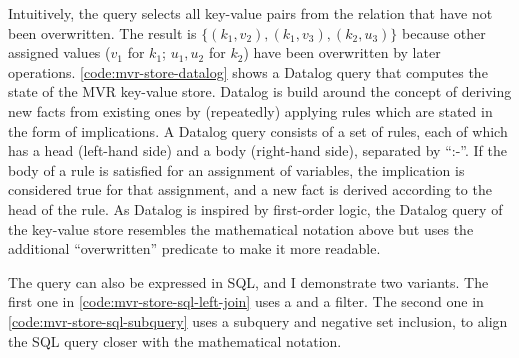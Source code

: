 Intuitively, the query selects all key-value pairs from the  relation
that have not been overwritten.
The result is \(\{ (k_1, v_2), (k_1, v_3), (k_2, u_3)\}\) because other assigned values
(\(v_1\) for \(k_1\); \(u_1, u_2\) for \(k_2\)) have been overwritten by later operations.
\ref{code:mvr-store-datalog} shows a Datalog query that computes the state of the
\ac{MVR} key-value store.
Datalog is build around the concept of deriving new facts from existing ones
by (repeatedly) applying rules which are stated in the form of implications.
A Datalog query consists of a set of rules, each of which has a
head (left-hand side) and a body (right-hand side), separated by ``:-''.
If the body of a rule is satisfied for an assignment of variables,
the implication is considered true for that assignment,
and a new fact is derived according to the head of the rule.
As Datalog is inspired by first-order logic, the Datalog query of the key-value
store resembles the mathematical notation above but uses the
additional ``overwritten'' predicate to make it more readable.

The query can also be expressed in SQL, and I demonstrate two variants.
The first one in \ref{code:mvr-store-sql-left-join} uses a 
and a  filter.
The second one in \ref{code:mvr-store-sql-subquery} uses a subquery
and negative set inclusion, to align the SQL query closer with the mathematical
notation.

